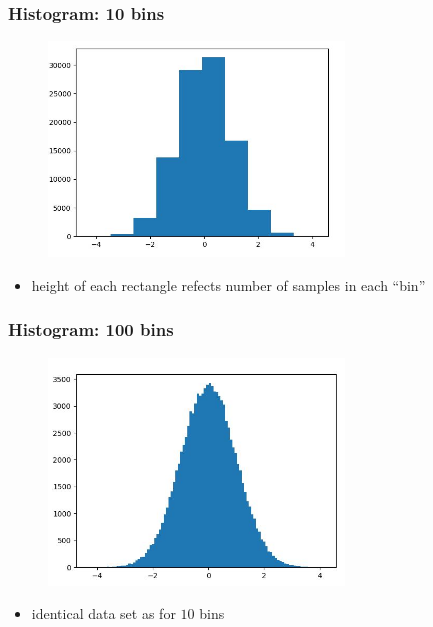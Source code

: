 \documentclass[english,14pt]{beamer}
\begin{document}

\begin{frame}[fragile]

\frametitle{Histogram: 10 bins}

\begin{figure}[ht]
	\centering
	\includegraphics[width=0.7\textwidth]{figures/hist10BinsExample}
\end{figure}

\vspace*{-5mm}

\begin{itemize}
	\item height of each rectangle refects number of samples in each ``bin''
\end{itemize}

\end{frame}


\begin{frame}[fragile]

\frametitle{Histogram: 100 bins}

\begin{figure}[ht]
	\centering
	\includegraphics[width=0.7\textwidth]{figures/hist100BinsExample}
\end{figure}

\vspace*{-5mm}

\begin{itemize}
	\item identical data set as for $10$ bins
\end{itemize}

\end{frame}
\end{document}
